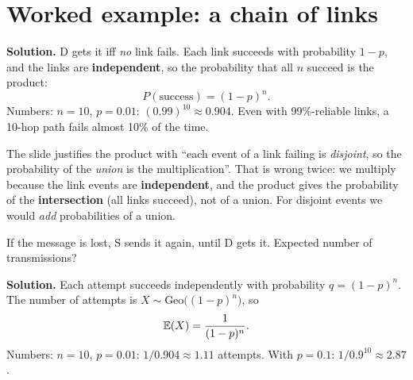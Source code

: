 \section{Worked example: a chain of links}

\begin{center}
\end{center}

\begin{example}
\textbf{Solution.} D gets it iff \emph{no} link fails. Each link succeeds with probability $1-p$, and the links are \textbf{independent}, so the probability that all $n$ succeed is the product:
\[ P(\text{success})=(1-p)^n. \]
Numbers: $n=10$, $p=0.01$: $(0.99)^{10}\approx0.904$. Even with 99\%-reliable links, a 10-hop path fails almost 10\% of the time.
\end{example}

\begin{pitfall}
The slide justifies the product with ``each event of a link failing is \emph{disjoint}, so the probability of the \emph{union} is the multiplication''.
That is wrong twice: we multiply because the link events are \textbf{independent}, and the product gives the probability of the \textbf{intersection}
(all links succeed), not of a union. For disjoint events we would \emph{add} probabilities of a union.
\end{pitfall}

\begin{example}
If the message is lost, S sends it again, until D gets it. Expected number of transmissions?

\textbf{Solution.} Each attempt succeeds independently with probability $q=(1-p)^n$. The number of attempts is $X\sim\text{Geo}\big((1-p)^n\big)$, so
\[ \mathbb{E}(X)=\frac{1}{(1-p)^n}. \]
Numbers: $n=10$, $p=0.01$: $1/0.904\approx1.11$ attempts. With $p=0.1$: $1/0.9^{10}\approx2.87$.
\end{example}

